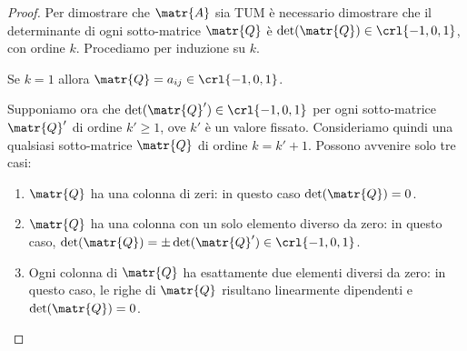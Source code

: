\documentclass[\main/main.tex]{subfiles}
\begin{document}
\begin{proof}
  Per dimostrare che $\matr{A}$ sia TUM è necessario dimostrare che il determinante di ogni sotto-matrice $\matr{Q}$ è $\det(\matr{Q}) \in \crl{-1, 0, 1}$, con ordine $k$. Procediamo per induzione su $k$.

  Se $k=1$ allora $\matr{Q} = a_{ij} \in \crl{-1,0,1}$.

  Supponiamo ora che $\det(\matr{Q}') \in \crl{-1,0,1}$ per ogni sotto-matrice $\matr{Q}'$ di ordine $k'\geq1$, ove $k'$ è un valore fissato. Consideriamo quindi una qualsiasi sotto-matrice $\matr{Q}$ di ordine $k = k'+1$. Possono avvenire solo tre casi:
  \begin{enumerate}
    \item $\matr{Q}$ ha una colonna di zeri: in questo caso $\det(\matr{Q})=0$.
    \item $\matr{Q}$ ha una colonna con un solo elemento diverso da zero: in questo caso, $\det(\matr{Q}) = \pm \det(\matr{Q}') \in \crl{-1,0,1}$.
    \item Ogni colonna di $\matr{Q}$ ha esattamente due elementi diversi da zero: in questo caso, le righe di $\matr{Q}$ risultano linearmente dipendenti e $\det(\matr{Q})=0$.
  \end{enumerate}
\end{proof}
\end{document}
